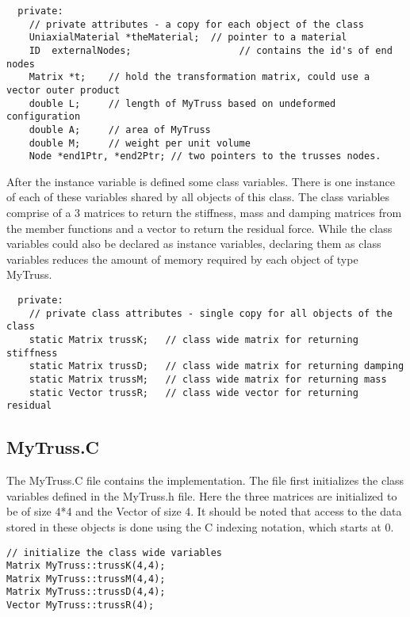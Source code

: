 \documentclass[12pt]{article}
\begin{document}
{\sf\small \begin{verbatim}    
  private:
    // private attributes - a copy for each object of the class
    UniaxialMaterial *theMaterial;  // pointer to a material
    ID  externalNodes;                   // contains the id's of end nodes
    Matrix *t;    // hold the transformation matrix, could use a vector outer product
    double L;     // length of MyTruss based on undeformed configuration
    double A; 	  // area of MyTruss
    double M; 	  // weight per unit volume
    Node *end1Ptr, *end2Ptr; // two pointers to the trusses nodes.
\end{verbatim} }

After the instance variable is defined some class variables. There is
one instance of each of these variables shared by all objects
of this class. The class variables comprise of a 3 matrices to return the
stiffness, mass and damping matrices from the member functions and a
vector to return the residual force. While the class variables could
also be declared as instance variables, declaring them as class
variables reduces the amount of memory required by each object of type
MyTruss. 

{\sf\small \begin{verbatim}
  private:
    // private class attributes - single copy for all objects of the class
    static Matrix trussK;   // class wide matrix for returning stiffness
    static Matrix trussD;   // class wide matrix for returning damping
    static Matrix trussM;   // class wide matrix for returning mass 
    static Vector trussR;   // class wide vector for returning residual
\end{verbatim} }

\subsection {\sf MyTruss.C}
The {\sf MyTruss.C} file contains the implementation. The file first
initializes the class variables defined in the {\sf MyTruss.h}
file. Here the three matrices are initialized to be of size 4*4 and
the Vector of size 4. It should be noted that access to the data
stored in these objects is done using the C indexing notation, which
starts at 0.

{\sf\small
\begin{verbatim}
// initialize the class wide variables
Matrix MyTruss::trussK(4,4);
Matrix MyTruss::trussM(4,4);
Matrix MyTruss::trussD(4,4);
Vector MyTruss::trussR(4);
\end{verbatim}
}
\end{document}
